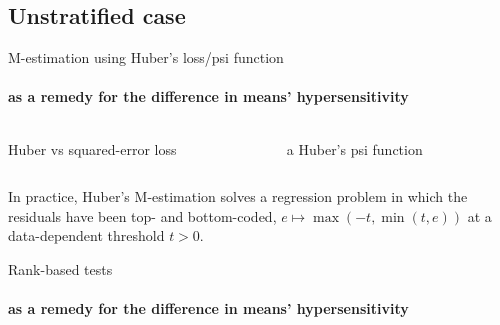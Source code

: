 \subsection{Unstratified case}

\begin{frame}{M-estimation using Huber's loss/psi function} \framesubtitle{as a remedy for the difference in means' hypersensitivity}
  \begin{columns}
    \begin{Column}
          \begin{center}
         { Huber vs squared-error loss}
    \end{center}
    \end{Column}
    \begin{Column}
          \begin{center}a
         { Huber's psi function}
    \end{center}

    \end{Column}
  \end{columns}
\pause
In practice, Huber's M-estimation solves a regression problem in which
the residuals have been top- and bottom-coded, $e \mapsto \max(-t,
\min(t,e))$ at a data-dependent threshold $t>0$.
\end{frame}
\begin{frame}{Rank-based tests } \framesubtitle{as a remedy for the difference in means' hypersensitivity}
  
\end{frame}

